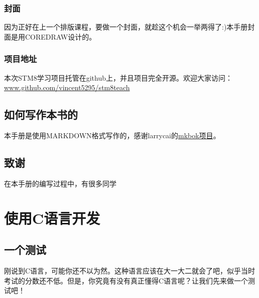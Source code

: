 \documentclass[a4paper]{book}
\makeatletter
\let\savedtitle=\@title
\renewcommand{\headrulewidth}{0pt}
\newcounter{tab}[chapter]
\newcommand{\chap}[1]{\newpage\thispagestyle{empty}\chapter{#1}\label{chap:\thechapter}}
\makeatother
\begin{document}
\subsection*{封面}

因为正好在上一个排版课程，要做一个封面，就趁这个机会一举两得了:)本手册封面是用COREDRAW设计的。

\subsection*{项目地址}

本次STM8学习项目托管在github上，并且项目完全开源。欢迎大家访问：\href{www.github.com/vincent5295/stm8teach}{www.github.com/vincent5295/stm8teach}

\section*{如何写作本书的}

本手册是使用MARKDOWN格式写作的，感谢larrycai的\href{www.github.com/larrycai/mkbok}{mkbok项目}。

\section*{致谢}

在本手册的编写过程中，有很多同学

\tableofcontents\newpage\thispagestyle{empty}


\fancyhf{}
\fancyhead[LE]{\color{colorheader}\quad\small\textbf\thepage\quad\quad\small\leftmark}
\fancyhead[RO]{\color{colorheader}\small\rightmark\quad\quad\small\textbf\thepage\quad}

\pagestyle{fancy}

\mainmatter
\chap{使用C语言开发}

\section{一个测试}

刚说到C语言，可能你还不以为然。这种语言应该在大一大二就会了吧，似乎当时考试的分数还不低。但是，你究竟有没有真正懂得C语言呢？让我们先来做一个测试吧！
\end{document}
